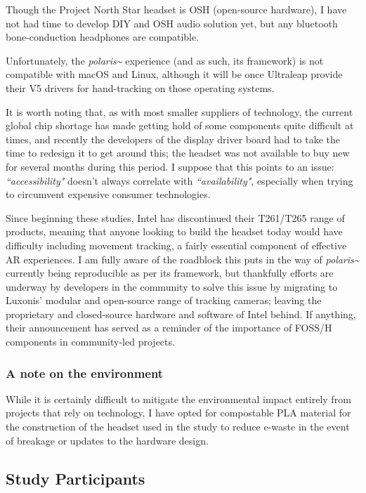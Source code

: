 Though the Project North Star headset is OSH (open-source hardware), I have not had time to develop DIY and OSH audio solution yet, but any bluetooth bone-conduction headphones are compatible.

Unfortunately, the \textit{polaris\textasciitilde{}} experience (and as such, its framework) is not compatible with macOS and Linux, although it will be once Ultraleap provide their V5 drivers for hand-tracking on those operating systems.

It is worth noting that, as with most smaller suppliers of technology, the current global chip shortage has made getting hold of some components quite difficult at times, and recently the developers of the display driver board had to take the time to redesign it to get around this; the headset was not available to buy new for several months during this period. I suppose that this points to an issue: \textit{``accessibility"} doesn’t always correlate with \textit{``availability"}, especially when trying to circumvent expensive consumer technologies.

Since beginning these studies, Intel has discontinued their T261/T265 range of products, meaning that anyone looking to build the headset today would have difficulty including movement tracking, a fairly essential component of effective AR experiences. I am fully aware of the roadblock this puts in the way of \textit{polaris\textasciitilde{}} currently being reproducible as per its framework, but thankfully efforts are underway by developers in the community to solve this issue by migrating to Luxonis’ modular and open-source range of tracking cameras; leaving the proprietary and closed-source hardware and software of Intel behind. If anything, their announcement has served as a reminder of the importance of FOSS/H components in community-led projects.

\subsubsection{A note on the environment}\label{sec: polaris-ethics-environment}
While it is certainly difficult to mitigate the environmental impact entirely from projects that rely on technology, I have opted for compostable PLA material for the construction of the headset used in the study to reduce e-waste in the event of breakage or updates to the hardware design.

\subsection{Study Participants}\label{sec: polaris-ethics-participants}
